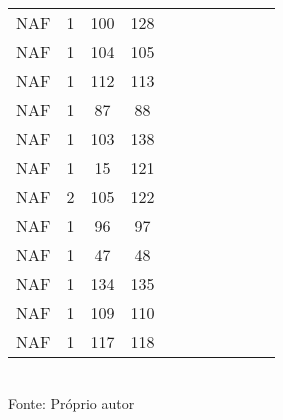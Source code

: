 \begin{table}[H]
{\begin{tabular}{ccccccccccc}
NAF & 1 & 100 & 128 &  &  &  &  &  &  &  \\
NAF & 1 & 104 & 105 &  &  &  &  &  &  &  \\
NAF & 1 & 112 & 113 &  &  &  &  &  &  &  \\
NAF & 1 & 87 & 88 &  &  &  &  &  &  &  \\
NAF & 1 & 103 & 138 &  &  &  &  &  &  &  \\
NAF & 1 & 15 & 121 &  &  &  &  &  &  &  \\
NAF & 2 & 105 & 122 &  &  &  &  &  &  &  \\
NAF & 1 & 96 & 97 &  &  &  &  &  &  &  \\
NAF & 1 & 47 & 48 &  &  &  &  &  &  &  \\
NAF & 1 & 134 & 135 &  &  &  &  &  &  &  \\
NAF & 1 & 109 & 110 &  &  &  &  &  &  &  \\
NAF & 1 & 117 & 118 &  &  &  &  &  &  &  \\
\bottomrule
\end{tabular}}
\\Fonte: Próprio autor
\end{table}



